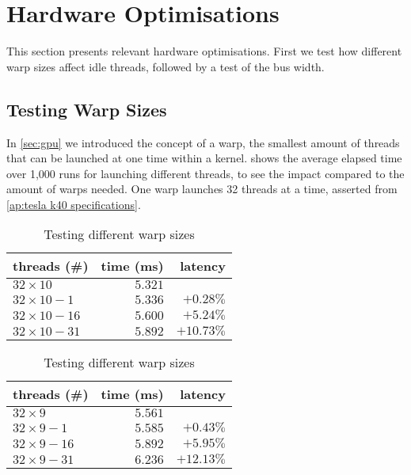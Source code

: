 \section{Hardware Optimisations}
\label{sec:hardware optimisations}

This section presents relevant hardware optimisations.
First we test how different warp sizes affect idle threads, followed by a test of the bus width.

\subsection{Testing Warp Sizes}
\label{sec:testing warp sizes}

In \cref{sec:gpu} we introduced the concept of a warp, the smallest amount of threads that can be launched at one time within a kernel.
 shows the average elapsed time over 1,000 runs for launching different threads, to see the impact compared to the amount of warps needed.
One warp launches 32 threads at a time, asserted from \cref{ap:tesla k40 specifications}.

\begin{table}[htb]%
  \begin{minipage}{0.49\linewidth}
    \centering
    \begin{tabular}{lrr}
      \toprule
      threads (\#) & time (ms) & latency \\
      \midrule
      $32 \times 10$    & $5.321$ &          \\
      $32 \times 10-1$  & $5.336$ & $+0.28\%$  \\
      $32 \times 10-16$ & $5.600$ & $+5.24\%$  \\
      $32 \times 10-31$ & $5.892$ & $+10.73\%$ \\
      \bottomrule
    \end{tabular}
  \end{minipage}%
  \begin{minipage}{0.49\linewidth}
    \centering
    \begin{tabular}{lrr}
      \toprule
      threads (\#) & time (ms) & latency \\
      \midrule
      $32 \times 9$     & $5.561$ & \\
      $32 \times 9-1$   & $5.585$ & $+0.43\%$  \\
      $32 \times 9-16$  & $5.892$ & $+5.95\%$  \\
      $32 \times 9-31$  & $6.236$ & $+12.13\%$ \\
      \bottomrule
    \end{tabular}
  \end{minipage}%
  \caption{Testing different warp sizes}
  \label{tab:warp size testing}
\end{table}

